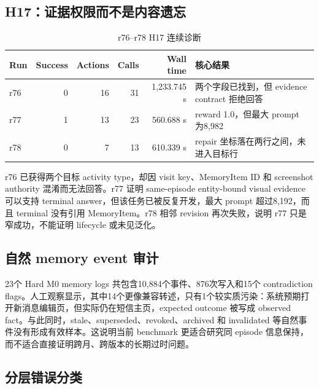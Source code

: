 \documentclass[12pt,a4paper]{ctexart}
\begin{document}
\subsection{H17：证据权限而不是内容遗忘}

\begin{table}[H]
    \centering
    \caption{r76--r78 H17 连续诊断}
    \label{tab:h17}
    \small
    \begin{tabularx}{\textwidth}{p{1.2cm}rrrrY}
        \toprule
        Run & Success & Actions & Calls & Wall time & 核心结果 \\
        \midrule
        r76 & 0 & 16 & 31 & 1,233.745 s & 两个字段已找到，但 evidence contract 拒绝回答 \\
        r77 & 1 & 13 & 23 & 560.688 s & reward 1.0，但最大 prompt 为8,982 \\
        r78 & 0 & 7 & 13 & 610.339 s & repair 坐标落在两行之间，未进入目标行 \\
        \bottomrule
    \end{tabularx}
\end{table}

r76 已获得两个目标 activity type，却因 visit key、MemoryItem ID 和 screenshot authority 混淆而无法回答。r77 证明 same-episode entity-bound visual evidence 可以支持 terminal answer，但该任务已被反复开发，最大 prompt 超过8,192，而且 terminal 没有引用 MemoryItem。r78 相邻 revision 再次失败，说明 r77 只是窄成功，不能证明 lifecycle 或未见泛化。

\subsection{自然 memory event 审计}

23个 Hard M0 memory logs 共包含10,884个事件、876次写入和15个 contradiction flags。人工观察显示，其中14个更像兼容转述，只有1个较实质污染：系统预期打开新消息编辑页，但实际仍在短信主页，expected outcome 被写成 observed fact。与此同时，stale、superseded、revoked、archived 和 invalidated 等自然事件没有形成有效样本。这说明当前 benchmark 更适合研究同 episode 信息保持，而不适合直接证明跨月、跨版本的长期过时问题。

\subsection{分层错误分类}
\end{document}
